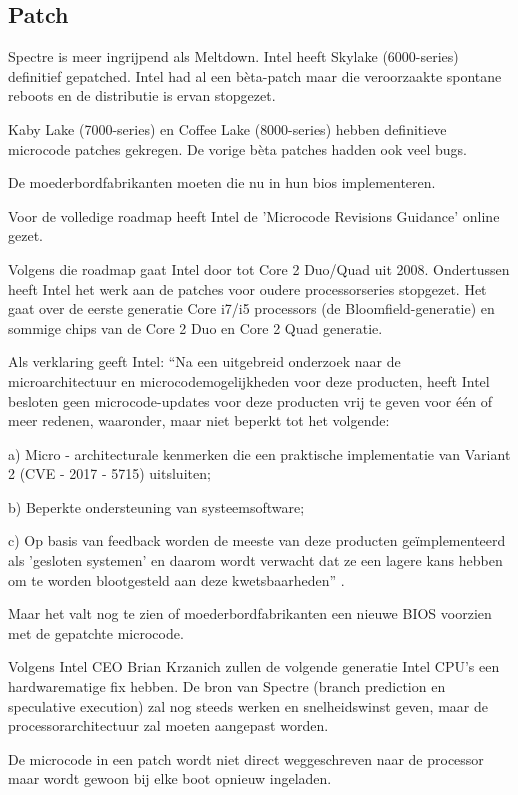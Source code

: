 \subsection{Patch}
Spectre is meer ingrijpend als Meltdown.
Intel heeft Skylake (6000-series) definitief gepatched.
Intel had al een bèta-patch maar die veroorzaakte spontane reboots en de distributie is ervan stopgezet.

Kaby Lake (7000-series) en Coffee Lake (8000-series) hebben definitieve microcode patches gekregen. De vorige bèta patches hadden ook veel bugs.

De moederbordfabrikanten moeten die nu in hun bios implementeren.

Voor de volledige roadmap heeft Intel de 'Microcode Revisions Guidance' online gezet.

Volgens die roadmap gaat Intel door tot Core 2 Duo/Quad uit 2008.
Ondertussen heeft Intel het werk aan de patches voor oudere processorseries stopgezet.
Het gaat over de eerste generatie Core i7/i5 processors (de Bloomfield-generatie) en sommige chips van de Core 2 Duo en Core 2 Quad generatie.


Als verklaring geeft Intel: ``Na een uitgebreid onderzoek naar de microarchitectuur en microcodemogelijkheden voor deze producten, heeft Intel besloten geen microcode-updates voor deze producten vrij te geven voor één of meer redenen, waaronder, maar niet beperkt tot het volgende:

a) Micro - architecturale kenmerken die een praktische implementatie van Variant 2 (CVE - 2017 - 5715) uitsluiten;

b) Beperkte ondersteuning van systeemsoftware;

c) Op basis van feedback worden de meeste van deze producten geïmplementeerd als 'gesloten systemen' en daarom wordt verwacht dat ze een lagere kans hebben om te worden blootgesteld aan deze kwetsbaarheden''  \parencite{Intel2018a}.


Maar het valt nog te zien of moederbordfabrikanten een nieuwe BIOS voorzien met de gepatchte microcode.

Volgens Intel CEO Brian Krzanich zullen de volgende generatie Intel CPU's een hardwarematige fix hebben. De bron van Spectre (branch prediction en speculative execution) zal nog steeds werken en snelheidswinst geven, maar de processorarchitectuur zal moeten aangepast worden.

De microcode in een patch wordt niet direct weggeschreven naar de processor maar wordt gewoon bij elke boot opnieuw ingeladen.

